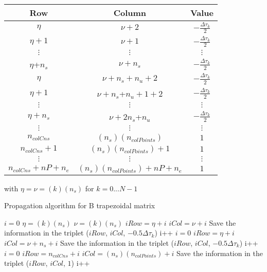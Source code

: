 \documentclass[12pt]{article}
\begin{document}
\begin{table}[h]
\begin{center}
\begin{tabular}{c|c|c}
Row    & Column        & Value \\ \hline
$\eta$      & $\nu+2$             & $-\frac{\Delta \tau_k}{2}$    \\
$\eta+1$    & $\nu+1$           & $-\frac{\Delta \tau_k}{2}$    \\
$\vdots$ & $\vdots$   &    $\vdots$     \\
$\eta$+$n_s$ & $\nu+n_s$        &$-\frac{\Delta \tau_k}{2}$   \\
$\eta$      & $\nu+n_s+n_u+2$  & $-\frac{\Delta \tau_k}{2}$   \\
$\eta+1$    & $\nu+n_s$+$n_u+1 +2$ & $-\frac{\Delta \tau_k}{2}$     \\
 $\vdots$ & $\vdots$     &    $\vdots$     \\
$\eta+n_s$ & $\nu+2n_s$+$n_u$  & $-\frac{\Delta \tau_k}{2}$  \\
 $\vdots$ & $\vdots$     &    $\vdots$     \\
$n_{colCns}$      & $(n_s)(n_{colPoints})$             & $1$    \\
$n_{colCns}+1$      & $(n_s)(n_{colPoints})+1$             & $1$    \\
$\vdots$ & $\vdots$   &    $\vdots$     \\
$n_{colCns}+nP+n_e$      & $(n_s)(n_{colPoints})+nP+n_e$             & $1$    \\
\end{tabular}
\end{center}
\end{table}

\noindent with $\eta=\nu=(k)(n_s)$ for $k=0...N-1$

\begin{algorithm}
	\caption{Propagation algorithm for B trapezoidal matrix} 
	\begin{algorithmic}[1]
		    \State $i=0$
		    \State $\eta=(k)(n_s)$
		    \State $\nu=(k)(n_s)$
			    \State $iRow=\eta+i$
			    \State $iCol=\nu+i$
				\State Save the information in the triplet ($iRow$, $iCol$, $-0.5 \Delta \tau_k$)
				\State i++
			\EndFor
			\State $i=0$
			    \State $iRow=\eta+i$
			    \State $iCol=\nu+n_s+i$
				\State Save the information in the triplet ($iRow$, $iCol$, $-0.5 \Delta \tau_k$)
				\State i++
			\EndFor
		\EndFor
		\State $i=0$
		        \State $iRow=n_{colCns}+i$
			    \State $iCol=(n_s)(n_{colPoints})+i$
				\State Save the information in the triplet ($iRow$, $iCol$, $1$)
				\State i++
		\EndFor
	\end{algorithmic} 
\end{algorithm}
\end{document}
